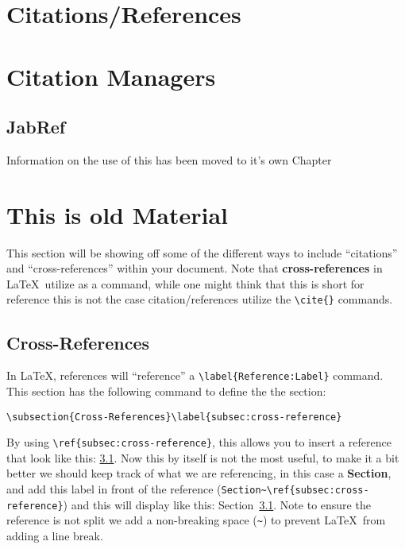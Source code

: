 	\section{Citations/References}
		
	
	\section{Citation Managers}
		
		\subsection{JabRef}
			Information on the use of this has been moved to it's own Chapter %
	\section{This is old Material}
	This section will be showing off some of the different ways to include \enquote{citations} and \enquote{cross-references} within your document.
		Note that \textbf{cross-references} in \LaTeX\ utilize  as a command, while one might think that this is short for reference this is not the case citation/references utilize the \lstinline|\cite{}| commands.
		\subsection{Cross-References}\label{subsec:cross-reference}
			In \LaTeX, references will \enquote{reference} a \lstinline|\label{Reference:Label}| command. 
			This section has the following command to define the the section:
			\begin{Center}
				\lstinline|\subsection{Cross-References}\label{subsec:cross-reference}|
			\end{Center}
			By using \lstinline|\ref{subsec:cross-reference}|, this allows you to insert a reference that look like this: \ref{subsec:cross-reference}.
			Now this by itself is not the most useful, to make it a bit better we should keep track of what we are referencing, in this case a \textbf{Section}, and add this label in front of the reference (\lstinline|Section~\ref{subsec:cross-reference}|) and this will display like this: Section~\ref{subsec:cross-reference}.
			Note to ensure the reference is not split we add a non-breaking space (\lstinline|~|) to prevent \LaTeX\ from adding a line break.


